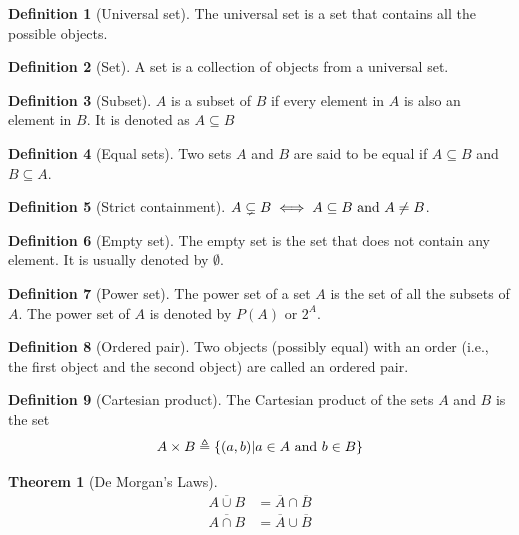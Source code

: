\documentclass[fleqn, a4paper, 12pt, twoside]{article}
\theoremstyle{definition}
\newtheorem{definition}{Definition}
\theoremstyle{theorem}
\newtheorem{theorem}{Theorem}
\begin{document}
\begin{definition}[Universal set]
	The universal set is a set that contains all the possible objects.
\end{definition}

\begin{definition}[Set]
	A set is a collection of objects from a universal set.
\end{definition}

\begin{definition}[Subset]
	$A$ is a subset of $B$ if every element in $A$ is also an element in $B$. It is denoted as $A \subseteq B$
\end{definition}

\begin{definition}[Equal sets]
	Two sets $A$ and $B$ are said to be equal if $A \subseteq B$ and $B \subseteq A$.
\end{definition}

\begin{definition}[Strict containment]
	$A \subsetneq B \iff A \subseteq B \textnormal{ and } A \neq B$.
\end{definition}

\begin{definition}[Empty set]
	The empty set is the set that does not contain any element. It is usually denoted by $\emptyset$.
\end{definition}

\begin{definition}[Power set]
	The power set of a set $A$ is the set of all the subsets of $A$. The power set of $A$ is denoted by $P(A)$ or $2^A$.
\end{definition}

\begin{definition}[Ordered pair]
	Two objects (possibly equal) with an order (i.e., the first object and the second object) are called an ordered pair.
\end{definition}

\begin{definition}[Cartesian product]
	The Cartesian product of the sets $A$ and $B$ is the set 
	\begin{equation*}
		A \times B \triangleq \{ (a,b) | a \in A \textnormal{ and } b \in B \}
	\end{equation*}
\end{definition}

\begin{theorem}[De Morgan's Laws]\label{De Morgan's Laws}
	\begin{align*}
		\overline{A \cup B} &= \overline{A} \cap \overline{B}\\
		\overline{A \cap B} &= \overline{A} \cup \overline{B}
	\end{align*}
\end{theorem}
\end{document}
